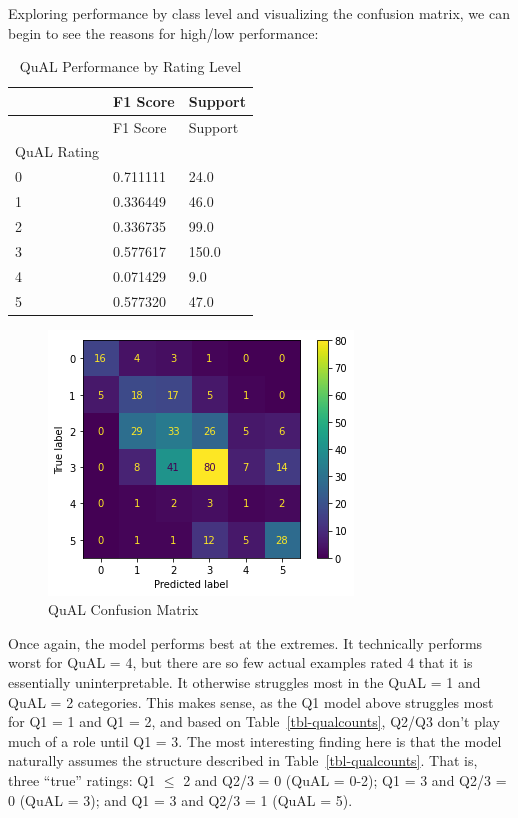 \documentclass[
  letterpaper,
  DIV=11,
  numbers=noendperiod]{scrartcl}
\begin{document}
Exploring performance by class level and visualizing the confusion
matrix, we can begin to see the reasons for high/low performance:

\hypertarget{tbl-qualbyrating}{}
\begin{longtable}[]{@{}lll@{}}
\caption{\label{tbl-qualbyrating}QuAL Performance by Rating
Level}\tabularnewline
\toprule()
& F1 Score & Support \\
\midrule()
\endfirsthead
\toprule()
& F1 Score & Support \\
\midrule()
\endhead
QuAL Rating & & \\
0 & 0.711111 & 24.0 \\
1 & 0.336449 & 46.0 \\
2 & 0.336735 & 99.0 \\
3 & 0.577617 & 150.0 \\
4 & 0.071429 & 9.0 \\
5 & 0.577320 & 47.0 \\
\bottomrule()
\end{longtable}

\begin{figure}

{\centering \includegraphics{results_lite_files/figure-pdf/fig-qualconf-output-1.png}

}

\caption{\label{fig-qualconf}QuAL Confusion Matrix}

\end{figure}

Once again, the model performs best at the extremes. It technically
performs worst for QuAL = 4, but there are so few actual examples rated
4 that it is essentially uninterpretable. It otherwise struggles most in
the QuAL = 1 and QuAL = 2 categories. This makes sense, as the Q1 model
above struggles most for Q1 = 1 and Q1 = 2, and based on
Table~\ref{tbl-qualcounts}, Q2/Q3 don't play much of a role until Q1 =
3. The most interesting finding here is that the model naturally assumes
the structure described in Table~\ref{tbl-qualcounts}. That is, three
``true'' ratings: Q1 \(\leq\) 2 and Q2/3 = 0 (QuAL = 0-2); Q1 = 3 and
Q2/3 = 0 (QuAL = 3); and Q1 = 3 and Q2/3 = 1 (QuAL = 5).
\end{document}
